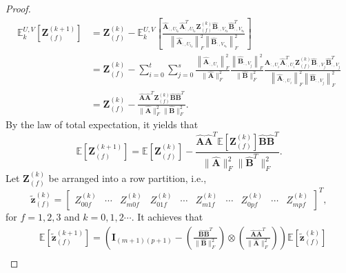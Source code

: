 \documentclass[11pt]{article}
\numberwithin{equation}{section}
\begin{document}
\begin{proof}
$$
\begin{aligned}
\mathbb{E}_{k}^{U, V}\left[\boldsymbol{Z}_{(f)}^{(k+1)}\right] & =\boldsymbol{Z}_{(f)}^{(k)}-\mathbb{E}_{k}^{U, V}\left[\frac{\hat{\boldsymbol{A}}_{:, U_{t_{k}}} \hat{\boldsymbol{A}}_{:, U_{t_{k}}}^{T} \boldsymbol{Z}_{(f)}^{(k)} \hat{\boldsymbol{B}}_{:,V_{s_{k}}} \hat{\boldsymbol{B}}^{T}_{:,V_{s_{k}}}}{\left\|\hat{\boldsymbol{A}}_{:, U_{t_{k}}}\right\|_{F}^{2}\left\|\hat{\boldsymbol{B}}_{:,V_{s_{k}}}\right\|_{F}^{2}}\right] \\
& =\boldsymbol{Z}_{(f)}^{(k)}-\sum_{i=0}^{t} \sum_{j=0}^{s} \frac{\left\|\hat{\boldsymbol{A}}_{:, U_{i}}\right\|_{F}^{2}}{\|\hat{\boldsymbol{A}}\|_{F}^{2}} \frac{\left\|\hat{\boldsymbol{B}}_{:,V_{j}}\right\|_{F}^{2}}{\|\hat{\boldsymbol{B}}\|_{F}^{2}} \frac{\hat{\boldsymbol{A}}_{:, U_{i}} \hat{\boldsymbol{A}}_{:, U_{i}}^{T} \boldsymbol{Z}_{(f)}^{(k)} \hat{\boldsymbol{B}}_{:,V_{j}} \hat{\boldsymbol{B}}_{:,V_{j}}^{T}}{\left\|\hat{\boldsymbol{A}}_{:, U_{i}}\right\|_{F}^{2}\left\|\hat{\boldsymbol{B}}_{:,V_{j}}\right\|_{F}^{2}} \\
& =\boldsymbol{Z}_{(f)}^{(k)}-\frac{\hat{\boldsymbol{A}} \hat{\boldsymbol{A}}^{T} \boldsymbol{Z}_{(f)}^{(k)} \hat{\boldsymbol{B}} \hat{\boldsymbol{B}}^{T}}{\|\hat{\boldsymbol{A}}\|_{F}^{2}\|\hat{\boldsymbol{B}}\|_{F}^{2}} .
\end{aligned}
$$
By the law of total expectation, it yields that
$$
\mathbb{E}\left[\boldsymbol{Z}_{(f)}^{(k+1)}\right]=\mathbb{E}\left[\boldsymbol{Z}_{(f)}^{(k)}\right]-\frac{\hat{\boldsymbol{A}} \hat{\boldsymbol{A}}^{T} \mathbb{E}\left[\boldsymbol{Z}_{(f)}^{(k)}\right] \hat{\boldsymbol{B}} \hat{\boldsymbol{B}}^{T}}{\|\hat{\boldsymbol{A}}\|_{F}^{2}\|\hat{\boldsymbol{B}}^{T}\|_{F}^{2}}.
$$
Let $\boldsymbol{Z}_{(f)}^{(k)}$ be arranged into a row partition, i.e.,
$$
\widetilde{\mathbf{z}}_{(f)}^{(k)}=\left[\begin{array}{llllllllll}
Z_{00 f}^{(k)} & \cdots & Z_{m 0 f}^{(k)} & Z_{01 f}^{(k)} & \cdots & Z_{m 1 f}^{(k)} & \cdots & Z_{0 p f}^{(k)} & \cdots & Z_{m p f}^{(k)}
\end{array}\right]^{T},
$$
for $f=1,2,3$ and $k=0,1,2 \cdots$. It achieves that
$$
\begin{aligned}
& \mathbb{E}\left[\widetilde{\boldsymbol{z}}_{(f)}^{(k+1)}\right]=\left(\boldsymbol{I}_{(m+1)(p+1)}-\left(\frac{\hat{\boldsymbol{B}} \hat{\boldsymbol{B}}^{T}}{\|\hat{\boldsymbol{B}}\|_{F}^{2}}\right) \otimes\left(\frac{\hat{\boldsymbol{A}} \hat{\boldsymbol{A}}^{T}}{\|\hat{\boldsymbol{A}}\|_{F}^{2}}\right)\right) \mathbb{E}\left[\widetilde{\boldsymbol{z}}_{(f)}^{(k)}\right] \\

\end{aligned}$$
\end{proof}
\end{document}
